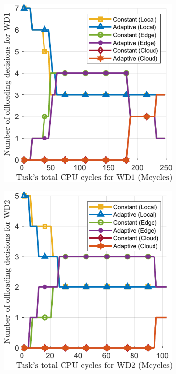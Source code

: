 \documentclass[12pt,draftclsnofoot,onecolumn]{IEEEtran}
\begin{document}
\begin{figure}[ht]
	\centering
	\begin{subfigure}[b]{.22\textwidth}
		\centering
		\includegraphics[width=\linewidth]{simulation_a.pdf}
		\caption{} \label{fig:6a}
	\end{subfigure}\hspace{15mm}
	\begin{subfigure}[b]{.22\textwidth}
		\centering
		\includegraphics[width=\linewidth]{simulation_b.pdf}

\end{subfigure}
\end{figure}
\end{document}
